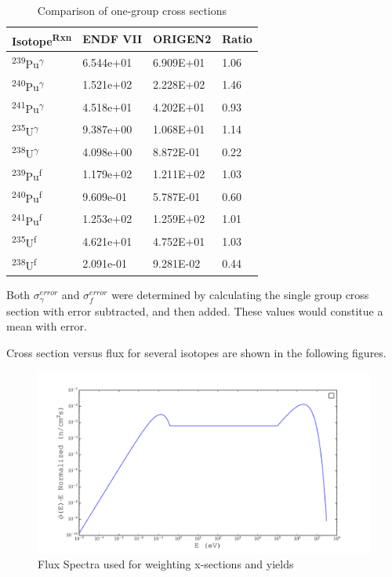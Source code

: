 \documentclass[11pt,notitlepage]{article}
\newcommand{\tss}{\textsuperscript}
\begin{document}
\begin{todolist}
  \begin{table}[H]
  \begin{center}
    \caption{Comparison of one-group cross sections}
    \label{Table:3}
    \begin{tabular}{l l l l}
      \toprule
      Isotope\tss{Rxn} & ENDF VII & ORIGEN2 & Ratio\\
      \hline
      \tss{239}Pu\tss{$\gamma$} & 6.544e+01 & 6.909E+01 & 1.06\\
      \tss{240}Pu\tss{$\gamma$} & 1.521e+02 & 2.228E+02 & 1.46\\
      \tss{241}Pu\tss{$\gamma$} & 4.518e+01 & 4.202E+01 & 0.93\\
      \tss{235}U\tss{$\gamma$}  & 9.387e+00 & 1.068E+01 & 1.14\\
      \tss{238}U\tss{$\gamma$}  & 4.098e+00 & 8.872E-01 & 0.22\\
      \tss{239}Pu\tss{f} & 1.179e+02 & 1.211E+02 & 1.03\\
      \tss{240}Pu\tss{f} & 9.609e-01 & 5.787E-01 & 0.60\\
      \tss{241}Pu\tss{f} & 1.253e+02 & 1.259E+02 & 1.01\\
      \tss{235}U\tss{f}  & 4.621e+01 & 4.752E+01 & 1.03\\
      \tss{238}U\tss{f}  & 2.091e-01 & 9.281E-02 & 0.44\\
      \bottomrule
    \end{tabular}
  \end{center}
  \end{table}

  Both $\sigma^{error}_\gamma$ and $\sigma^{error}_f$
  were determined by calculating the single group cross section
  with error subtracted, and then added. These values would
  constitue a mean with error.

  Cross section versus flux for several isotopes are shown in the
  following figures.

  \begin{figure}[H]
    \begin{center}
      \includegraphics[width=0.77\columnwidth]{../Weighting/Flux_Spectra.pdf}
      \vspace{-5mm}
      \caption{Flux Spectra used for weighting x-sections and yields}
      \label{fig:Flux}
    \end{center}
  \end{figure}
  

\end{todolist}
\end{document}
